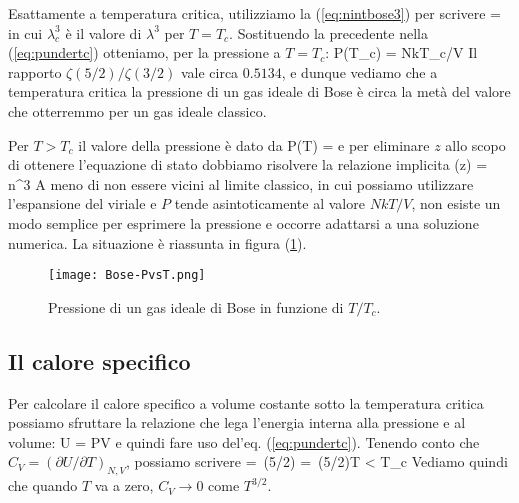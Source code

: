 Esattamente a temperatura critica, utilizziamo la (\ref{eq:nintbose3}) per scrivere
\be
{} = 
\ee
in cui $\lambda^3_c$ è il valore di $\lambda^3$ per $T=T_c$. Sostituendo la precedente nella (\ref{eq:pundertc}) otteniamo, per la pressione a $T=T_c$:
\be
\label{eq:pattc}
P(T_c) = NkT_c/V
\ee
Il rapporto $\zeta(5/2)/\zeta(3/2)$ vale circa $0.5134$, e dunque vediamo che a temperatura critica la pressione di un gas ideale di Bose è circa la metà del valore che otterremmo per un gas ideale classico.

Per $T > T_c$ il valore della pressione è dato da
\be
\label{eq:povertc}
P(T) = 
\ee
e per eliminare $z$ allo scopo di ottenere l'equazione di stato dobbiamo risolvere la relazione implicita
\be
{}(z) = n\lambda^3
\ee
A meno di non essere vicini al limite classico, in cui possiamo utilizzare l'espansione del viriale e $P$ tende asintoticamente al valore $NkT/V$, non esiste un modo semplice per esprimere la pressione e occorre adattarsi a una soluzione numerica. La situazione è riassunta in figura
(\ref{fig:PvsT}).
\begin{figure}[!ht]
	\centering
	\texttt{[image: Bose-PvsT.png]}
	\caption{Pressione di un gas ideale di Bose in funzione di $T/T_c$.}
	\label{fig:PvsT}
\end{figure}

\subsection{Il calore specifico}

Per calcolare il calore specifico a volume costante sotto la temperatura critica possiamo sfruttare la relazione che lega l'energia interna alla pressione e al volume:
\be
U = PV
\ee
e quindi fare uso del'eq. (\ref{eq:pundertc}). Tenendo conto che $C_V = (\partial U/\partial T)_{N,V}$, possiamo scrivere
\be
{}  = \,\zeta(5/2)
= \,\zeta(5/2)\quad\quad T < T_c
\ee
Vediamo quindi che quando $T$ va a zero, $C_V\to 0$ come $T^{3/2}$. 

